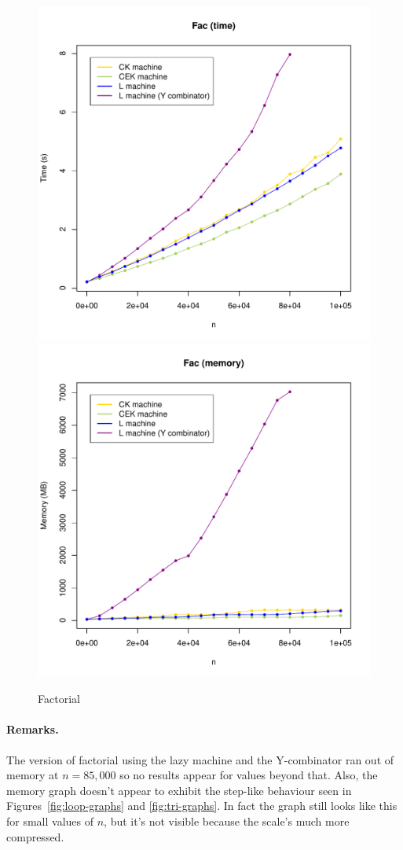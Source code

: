 \documentclass[a4paper]{article}
\begin{document}
\begin{figure}[H]
\centering
\includegraphics[width=0.7\linewidth]{figs/fac-times.pdf}
\includegraphics[width=0.7\linewidth]{figs/fac-mem.pdf}
\caption{Factorial}\label{fig:fac-graphs}
\end{figure}

\paragraph{Remarks.}  The version of factorial using the lazy machine and the Y-combinator 
ran out of memory at $n=85,000$ so no results appear for values beyond
that. Also, the memory graph doesn't appear to exhibit the step-like
behaviour seen in Figures~\ref{fig:loop-graphs} and
\ref{fig:tri-graphs}.  In fact the graph still looks like this for
small values of $n$, but it's not visible  because the scale's much more compressed.
\end{document}
